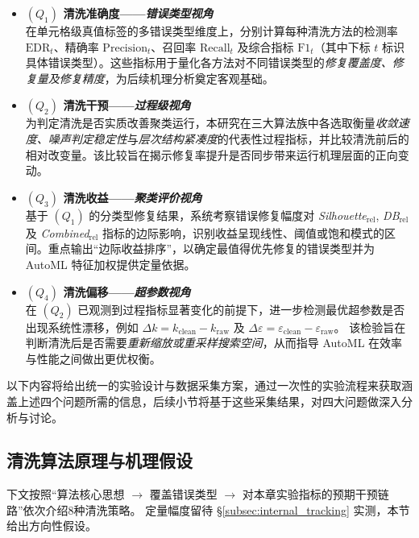 \documentclass[10pt]{article} %
\numberwithin{equation}{section}
\begin{document}
\begin{itemize}
    \item \textbf{\((Q_1)\) 清洗准确度——\emph{错误类型视角}}\\
          \textcolor[rgb]{0.00,0.07,1.00}{在单元格级真值标签的多错误类型维度上，分别计算每种清洗方法的检测率 \(\mathrm{EDR}_t\)、精确率 \(\mathrm{Precision}_t\)、召回率 \(\mathrm{Recall}_t\) 及综合指标 \(\mathrm{F1}_t\)（其中下标 \(t\) 标识具体错误类型）。这些指标用于量化各方法对不同错误类型的\emph{修复覆盖度、修复量及修复精度}，为后续机理分析奠定客观基础。}

    \item \textbf{\((Q_2)\) 清洗干预——\emph{过程级视角}}\\
          \textcolor[rgb]{0.00,0.07,1.00}{为判定清洗是否实质改善聚类运行，本研究在三大算法族中各选取衡量\emph{收敛速度、噪声判定稳定性}与\emph{层次结构紧凑度}的代表性过程指标，并比较清洗前后的相对改变量。该比较旨在揭示修复率提升是否同步带来运行机理层面的正向变动。}

    \item \textbf{\((Q_3)\) 清洗收益——\emph{聚类评价视角}}\\
          \textcolor[rgb]{0.00,0.07,1.00}{基于 \((Q_1)\) 的分类型修复结果，系统考察错误修复幅度对 \emph{Silhouette\(_{\mathrm{rel}}\)}, \emph{DB\(_{\mathrm{rel}}\)} 及 \emph{Combined\(_{\mathrm{rel}}\)} 指标的边际影响，识别收益呈现线性、阈值或饱和模式的区间。重点输出“边际收益排序”，以确定最值得优先修复的错误类型并为 AutoML 特征加权提供定量依据。}

    \item \textbf{\((Q_4)\) 清洗偏移——\emph{超参数视角}}\\
          \textcolor[rgb]{0.00,0.07,1.00}{在 \((Q_2)\) 已观测到过程指标显著变化的前提下，进一步检测最优超参数是否出现系统性漂移，例如  
          \(\Delta k = k_{\mathrm{clean}} - k_{\mathrm{raw}}\) 及  
          \(\Delta\varepsilon = \varepsilon_{\mathrm{clean}} - \varepsilon_{\mathrm{raw}}\)。  
          该检验旨在判断清洗后是否需要\emph{重新缩放或重采样搜索空间}，从而指导 AutoML 在效率与性能之间做出更优权衡。}
\end{itemize}

\noindent
以下内容将给出统一的实验设计与数据采集方案，通过一次性的实验流程来获取涵盖上述四个问题所需的信息，后续小节将基于这些采集结果，对四大问题做深入分析与讨论。

\subsection{清洗算法原理与机理假设}
\label{sec:clean-principle}
下文按照“算法核心思想 $\rightarrow$ 覆盖错误类型
$\rightarrow$ 对本章实验指标的预期干预链路”依次介绍8种清洗策略。
定量幅度留待 \S\ref{subsec:internal_tracking} 实测，本节给出方向性假设。
\end{document}
